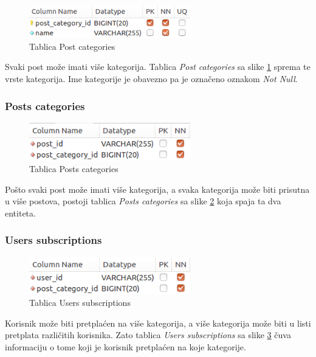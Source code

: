 \documentclass[zavrsni, numeric]{fer}
\begin{document}
\begin{figure}[H]
	\centering
	\includegraphics[width=7cm]{slike/t-post_categories.png}
	\caption{Tablica Post categories}
	\label{fig:t-post_categories}
\end{figure}

Svaki post može imati više kategorija. Tablica \textit{Post categories} sa slike \ref{fig:t-post_categories} sprema te vrste kategorija. Ime kategorije je obavezno pa je označeno oznakom \textit{Not Null}.

\subsubsection{Posts categories}

\begin{figure}[H]
	\centering
	\includegraphics[width=7cm]{slike/t-posts_categories.png}
	\caption{Tablica Posts categories}
	\label{fig:t-posts_categories}
\end{figure}

Pošto svaki post može imati više kategorija, a svaka kategorija može biti prisutna u više postova, postoji tablica \textit{Posts categories} sa slike \ref{fig:t-posts_categories} koja spaja ta dva entiteta.

\subsubsection{Users subscriptions}

\begin{figure}[H]
	\centering
	\includegraphics[width=7cm]{slike/t-users_subscriptions.png}
	\caption{Tablica Users subscriptions}
	\label{fig:t-users_subscriptions} 
\end{figure}

Korisnik može biti pretplaćen na više kategorija, a više kategorija može biti u listi pretplata različitih korisnika. Zato tablica \textit{Users subscriptions} sa slike \ref{fig:t-users_subscriptions} čuva informaciju o tome koji je korisnik pretplaćen na koje kategorije.
\end{document}
